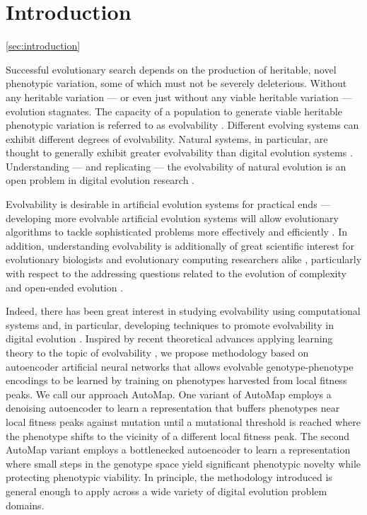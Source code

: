 \section{Introduction} \ref{sec:introduction}

Successful evolutionary search depends on the production of heritable, novel phenotypic variation, some of which must not be severely deleterious.
Without any heritable variation --- or even just without any viable heritable variation --- evolution stagnates.
The capacity of a population to generate viable heritable phenotypic variation is referred to as evolvability \cite{tarapore2015evolvability}.
Different evolving systems can exhibit different degrees of evolvability.
Natural systems, in particular, are thought to generally exhibit greater evolvability than digital evolution systems \cite{wagner1996perspective}.
Understanding --- and replicating --- the evolvability of natural evolution is an open problem in digital evolution research \cite{mengistu2016evolvability}.

Evolvability is desirable in artificial evolution systems for practical ends --- developing more evolvable artificial evolution systems will allow evolutionary algorithms to tackle sophisticated problems more effectively and efficiently \cite{bentley1999three, reisinger2007acquiring}.
In addition, understanding evolvability is additionally of great scientific interest for evolutionary biologists and evolutionary computing researchers alike \cite{mengistu2016evolvability, pigliucci2008evolvability}, particularly with respect to the addressing questions related to the evolution of complexity and open-ended evolution \cite{kirschner1998evolvability, hu2010evolvability}.

Indeed, there has been great interest in studying evolvability using computational systems and, in particular, developing techniques to promote evolvability in digital evolution \cite{kashtan2005spontaneous, mengistu2016evolvability, reisinger2005towards, cheney2013unshackling, nguyen2015innovation, lehman2013evolvability}.
Inspired by recent theoretical advances applying learning theory to the topic of evolvability \cite{kouvaris2017evolution, watson2016can}, we propose methodology based on autoencoder artificial neural networks that allows evolvable genotype-phenotype encodings to be learned by training on phenotypes harvested from local fitness peaks.
We call our approach AutoMap.
One variant of AutoMap employs a denoising autoencoder to learn a representation that buffers phenotypes near local fitness peaks against mutation until a mutational threshold is reached where the phenotype shifts to the vicinity of a different local fitness peak.
The second AutoMap variant employs a bottlenecked autoencoder to learn a representation where small steps in the genotype space yield significant phenotypic novelty while protecting phenotypic viability.
In principle, the methodology introduced is general enough to apply across a wide variety of digital evolution problem domains.
